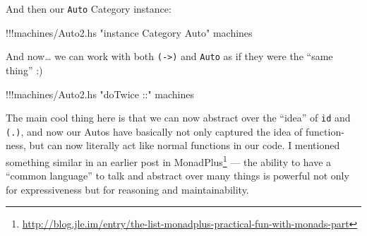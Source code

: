 \documentclass[]{article}
\newenvironment{Shaded}{}{}
\newcommand{\DecValTok}[1]{\textcolor[rgb]{0.25,0.63,0.44}{{#1}}}
\newcommand{\StringTok}[1]{\textcolor[rgb]{0.25,0.44,0.63}{{#1}}}
\newcommand{\FunctionTok}[1]{\textcolor[rgb]{0.02,0.16,0.49}{{#1}}}
\newcommand{\NormalTok}[1]{{#1}}
\renewcommand{\href}[2]{#2\footnote{\url{#1}}}
\begin{document}
And then our \texttt{Auto} Category instance:

\begin{Shaded}
\begin{Highlighting}[]
\FunctionTok{!!!}\NormalTok{machines}\FunctionTok{/}\NormalTok{Auto2.hs }\StringTok{"instance Category Auto"} \NormalTok{machines}
\end{Highlighting}
\end{Shaded}

And now\ldots{} we can work with both \texttt{(-\textgreater{})} and
\texttt{Auto} as if they were the ``same thing'' :)

\begin{Shaded}
\begin{Highlighting}[]
\FunctionTok{!!!}\NormalTok{machines}\FunctionTok{/}\NormalTok{Auto2.hs }\StringTok{"doTwice ::"} \NormalTok{machines}
\end{Highlighting}
\end{Shaded}

\begin{Shaded}
\end{Shaded}

The main cool thing here is that we can now abstract over the ``idea''
of \texttt{id} and \texttt{(.)}, and now our Autos have basically not
only captured the idea of function-ness, but can now literally act like
normal functions in our code. I mentioned something similar in an
earlier post
\href{http://blog.jle.im/entry/the-list-monadplus-practical-fun-with-monads-part}{in
MonadPlus} --- the ability to have a ``common language'' to talk and
abstract over many things is powerful not only for expressiveness but
for reasoning and maintainability.
\end{document}
